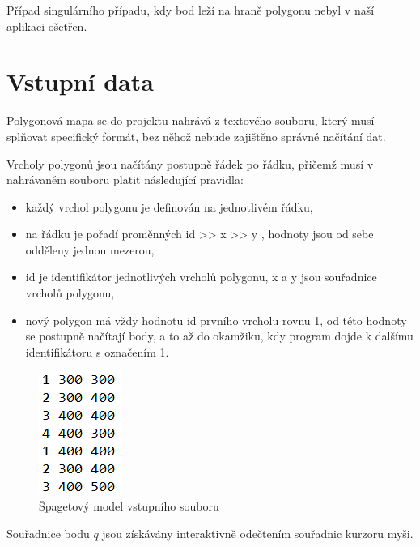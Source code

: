 \documentclass[11pt]{article}
\begin{document}
Případ singulárního případu, kdy bod leží na hraně polygonu nebyl v naší aplikaci ošetřen.

\clearpage





\section{Vstupní data}

Polygonová mapa se do projektu nahrává z textového souboru, který musí splňovat specifický formát, bez něhož nebude zajištěno správné načítání dat.  

Vrcholy polygonů jsou načítány postupně řádek po řádku, přičemž musí v nahrávaném souboru platit následující pravidla:    

\begin{itemize}
\item každý vrchol polygonu je definován na jednotlivém řádku,
\item na řádku je pořadí proměnných id >> x >> y   ,  hodnoty jsou od sebe odděleny  jednou mezerou,
\item id je identifikátor jednotlivých vrcholů polygonu, x a y jsou souřadnice vrcholů polygonu,    
\item nový polygon má vždy hodnotu id prvního vrcholu rovnu 1, od této hodnoty  se  postupně načítají body, a  to až do okamžiku,  kdy program dojde  k dalšímu identifikátoru s označením 1.   
\end{itemize}

\begin{figure}[htbh]
	\centering
	\includegraphics[scale=1.5]{images/vstup.png} 
	\caption{Špagetový model vstupního souboru}
	\label{fig:vstup.}
\end{figure} 

Souřadnice bodu $q$ jsou získávány interaktivně odečtením souřadnic kurzoru myši.   
\end{document}
